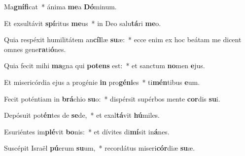 \item Ma\textbf{gnífi}cat~* ánima \textbf{me}a \textbf{Dó}minum.

\item Et exsultávit \textbf{spí}ritus \textbf{me}us~* in Deo salu\textbf{tá}ri \textbf{me}o.

\item Quia respéxit humilitátem an\textbf{cíl}læ \textbf{su}æ:~* ecce enim ex hoc beátam me dicent omnes gene\textbf{ra}ti\textbf{ó}nes.

\item Quia fecit mihi \textbf{ma}gna qui \textbf{potens} est:~* et sanctum \textbf{no}men \textbf{e}jus.

\item Et misericórdia ejus a progénie \textbf{in} pro\textbf{géni}es~* ti\textbf{mén}tibus \textbf{e}um.

\item Fecit poténtiam in \textbf{brá}chio \textbf{su}o:~* dispérsit supérbos mente \textbf{cor}dis \textbf{su}i.

\item Depósuit pot\textbf{én}tes de \textbf{se}de,~* et exal\textbf{tá}vit \textbf{hú}miles.

\item Esuriéntes im\textbf{plé}vit \textbf{bo}nis:~* et dívites di\textbf{mí}sit in\textbf{á}nes.

\item Suscépit Israël \textbf{pú}erum \textbf{su}um,~* recordátus miseri\textbf{cór}diæ \textbf{su}æ.



